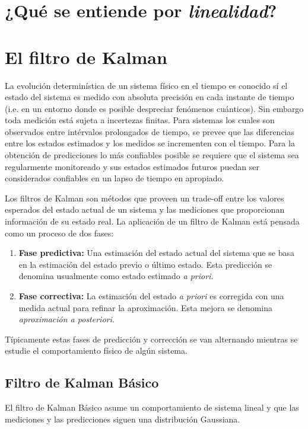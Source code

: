 \section{¿Qué se entiende por \textit{linealidad}?}
\section{El filtro de Kalman}
La evoluci\'on determin\'istica de un sistema f\'isico en el tiempo es conocido s\'i el estado del sistema es medido con absoluta precisi\'on en cada instante de tiempo (i.e. en un entorno donde es posible despreciar fen\'omenos cu\'anticos). Sin embargo toda medici\'on est\'a sujeta a incertezas finitas. Para sistemas los cuales son observados entre int\'ervalos prolongados de tiempo, se prevee que las diferencias entre los estados estimados y los medidos se incrementen con el tiempo. Para la obtenci\'on de predicciones lo m\'as confiables posible se requiere que el sistema sea regularmente monitoreado y sus estados estimados futuros puedan ser considerados confiables en un lapso de tiempo en apropiado. 
\bigskip

Los filtros de Kalman son m\'etodos que proveen un trade-off entre los valores esperados del estado actual de un sistema y las mediciones que proporcionan informaci\'on de su estado real. La aplicaci\'on de un filtro de Kalman est\'a pensada como un proceso de dos fases:
\begin{enumerate}
\item \textbf{Fase predictiva:} Una estimaci\'on del estado actual del sistema que se basa en la estimaci\'on del estado previo o \'ultimo estado. Esta predicci\'on se denomina usualmente como estado estimado \textit{a priori}. 
\item \textbf{Fase correctiva:} La estimaci\'on del estado \textit{a priori} es corregida con una medida actual para refinar la aproximaci\'on. Esta mejora se denomina \textit{aproximaci\'on a posteriori.}
\end{enumerate}

T\'ipicamente estas fases de predicci\'on y correcci\'on se van alternando mientras se estudie el comportamiento f\'isico de alg\'un sistema.
\bigskip

\subsection{Filtro de Kalman B\'asico}
El filtro de Kalman B\'asico asume un comportamiento de sistema lineal y que las mediciones y las predicciones siguen una distribuci\'on Gaussiana. 
\bigskip

